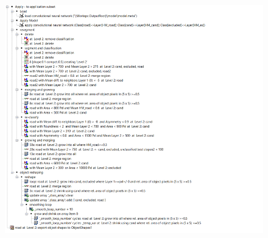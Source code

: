 \documentclass[remotesensing,article,submit,pdftex,moreauthors]{Definitions/mdpi}
\begin{document}
\begin{figure}[H]
\includegraphics[width=10.5 cm]{appendix2.png}
\end{figure}   
\end{document}
